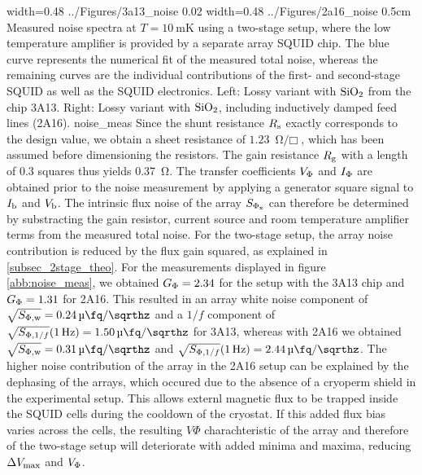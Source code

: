 {width=0.48\textwidth}
{../Figures/3a13_noise}
{0.02\textwidth} %
{width=0.48\textwidth}
{../Figures/2a16_noise}
{0.5cm} %
{Measured noise spectra at $T=\qty{10}{\milli\kelvin}$ using a two-stage setup, where the low temperature amplifier is provided by a separate array SQUID chip. The blue curve represents the numerical fit of the measured total noise, whereas the remaining curves are the individual contributions of the first- and second-stage SQUID as well as the SQUID electronics. Left: Lossy variant with ${\rm SiO_2}$ from the chip 3A13. Right: Lossy variant with ${\rm SiO_2}$, including inductively damped feed lines (2A16). }
{noise_meas}
Since the shunt resistance $R_{\rm s}$ exactly corresponds to the design value, we obtain a sheet resistance of $\qty{1.23}{\ohm\per\Box}$, which has been assumed before dimensioning the resistors. The gain resistance $R_{\rm g}$ with a length of 0.3 squares thus yields \qty{0.37}{\ohm}. The transfer coefficients $V_{\rm \Phi}$ and $I_{\rm \Phi}$ are obtained prior to the noise measurement by applying a generator square signal to $I_{\rm b}$ and $V_{\rm b}$. The intrinsic flux noise of the array $S_{\rm \Phi_x}$ can therefore be determined by substracting the gain resistor, current source and room temperature amplifier terms from the measured total noise. For the two-stage setup, the array noise contribution is reduced by the flux gain squared, as explained in \ref{subsec_2stage_theo}. For the measurements displayed in figure \ref{abb:noise_meas}, we obtained $G_{\rm \Phi}=2.34$ for the setup with the 3A13 chip and $G_{\rm \Phi}=1.31$ for 2A16. This resulted in an array white noise component of $\sqrt{S_{\rm \Phi,w}}=\qty{0.24}{\micro\fq\per\sqrthz}$ and a $1/f$ component of $\sqrt{S_{{\rm \Phi},1/f}}(\qty{1}{\Hz})=\qty{1.50}{\micro\fq\per\sqrthz}$ for 3A13, whereas with 2A16 we obtained $\sqrt{S_{\rm \Phi,w}}=\qty{0.31}{\micro\fq\per\sqrthz}$ and $\sqrt{S_{{\rm \Phi},1/f}}(\qty{1}{\Hz})=\qty{2.44}{\micro\fq\per\sqrthz}$. The higher noise contribution of the array in the 2A16 setup can be explained by the dephasing of the arrays, which occured due to the absence of a cryoperm shield in the experimental setup. This allows externl magnetic flux to be trapped inside the SQUID cells during the cooldown of the cryostat. If this added flux bias varies across the cells, the resulting $V\Phi$ charachteristic of the array and therefore of the two-stage setup will deteriorate with added minima and maxima, reducing $\Delta V_{\rm max}$ and $V_{\rm \Phi}$. \\

